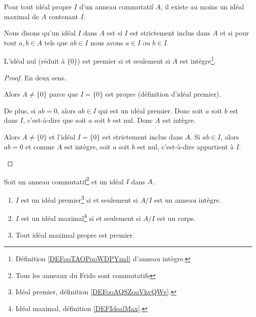 \begin{theorem}      \label{THOooFWYLooOofaPa}
	Pour tout idéal propre \( I\) d'un anneau commutatif \( A\), il existe au moins un idéal maximal de \( A\) contenant \( I\).
\end{theorem}


\begin{definition}      \label{DEFooAQSZooVhvQWv}
	Nous disons qu'un idéal \( I\) dans \( A\) est  si \( I\) est strictement inclus dans \( A\) et si pour tout \( a,b\in A\) tels que \( ab\in I\) nous avons \( a\in I\) ou \( b\in I\).
\end{definition}

\begin{lemma}       \label{LEMooYRPBooYxXXsi}
	L'idéal nul (réduit à \( \{ 0 \}\)) est premier si et seulement si \( A\) est intègre\footnote{Définition \ref{DEFooTAOPooWDPYmd} d'anneau intègre.}.
\end{lemma}

\begin{proof}
	En deux sens.
	\begin{subproof}
		Alors \( A\neq \{ 0 \}\) parce que \( I=\{ 0 \}\) est propre (définition d'idéal premier).

		De plus, si \( ab=0\), alors \( ab\in I\) qui est un idéal premier. Donc soit \( a\) soit \( b\) est dans \( I\), c'est-à-dire que soit \( a\) soit \( b\) est nul. Donc \( A\) est intègre.

		Alors \( A\neq \{ 0 \}\) et l'idéal \( I=\{ 0 \}\) est strictement inclus dans \( A\). Si \( ab\in I\), alors \( ab=0\) et comme \( A\) est intègre, soit \( a\) soit \( b\) est nul, c'est-à-dire appartient à \( I\).
	\end{subproof}
\end{proof}

\begin{proposition}      \label{PROPooRUQKooIfbnQX}
	Soit un anneau commutatif\footnote{Tous les anneaux du Frido sont commutatifs} et un idéal \( I\) dans \( A\).
	\begin{enumerate}
		\item       \label{ITEMooUGBTooOGrnWl}
		      \( I\) est un idéal premier\footnote{Idéal premier, définition \ref{DEFooAQSZooVhvQWv}.} si et seulement si \( A/I\) est un anneau intègre.
		\item   \label{ITEMooGLXSooUjINqR}
		      \( I\) est un idéal maximal\footnote{Idéal maximal, définition \ref{DEFIdealMax}.} si et seulement si \( A/I\) est un corps.
		\item       \label{ITEMooTFFQooOUajFw}
		      Tout idéal maximal propre est premier.
	\end{enumerate}
\end{proposition}

